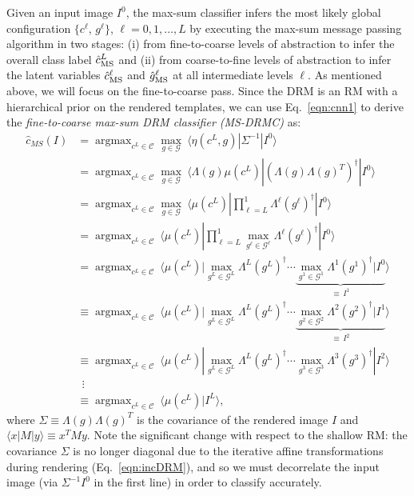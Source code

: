 \documentclass[12pt]{article}
\DeclareMathOperator*{\argmax}{argmax}
\newcommand{\dg}[0]{{ \dagger }}
\newcommand{\Cl}[0]{{ \mathcal{C} }}
\newcommand{\G}[0]{{ \mathcal{G} }}
\begin{document}
Given an input image $I^0$, the max-sum classifier infers the most likely global configuration $\{ c^{\ell}$, $g^\ell \}$, $\ell=0,1,\dots,L$ by executing the max-sum message passing algorithm in two stages: (i) from fine-to-coarse levels of abstraction to infer the overall class label $\hat{c}^L_{\rm MS}$ and (ii) from coarse-to-fine levels of abstraction to infer the latent variables $\hat{c}^\ell_{\rm MS}$ and $\hat{g}^\ell_{\rm MS} $ at all intermediate levels $\ell$. 
As mentioned above, we will focus on the fine-to-coarse pass.
Since the DRM is an RM with a hierarchical prior on the rendered templates, we can use Eq.~\ref{eqn:cnn1} to derive the \emph{fine-to-coarse max-sum DRM classifier (MS-DRMC)} as:
\begin{align} 
	\hat{c}_{MS}(I) &= \argmax_{c^{L} \in \Cl} \max_{g\in \G} \: \langle \eta(c^{L},g) | \Sigma^{-1} | I^{0} \rangle \nonumber\\
	                        &= \argmax_{c^{L} \in \Cl} \max_{g\in \G} \: \langle \Lambda(g) \mu(c^{L}) | (\Lambda(g) \Lambda(g)^{T})^{\dg} | I^{0}  \rangle \nonumber\\
	                        &= \argmax_{c^{L} \in \Cl} \max_{g\in \G} \: \langle \mu(c^{L}) | \prod_{\ell=L}^{1} \Lambda^{\ell}(g^{\ell})^{\dg} | I^{0}  \rangle \nonumber\\
	                        &= \argmax_{c^{L} \in \Cl} \: \langle \mu(c^{L}) | \prod_{\ell=L}^{1} \max_{g^{\ell}\in \G^{\ell}} \Lambda^{\ell}(g^{\ell})^{\dg} | I^{0}  \rangle \nonumber\\
	                        &= \argmax_{c^{L} \in \Cl} \: \langle \mu(c^{L}) | \max_{g^{L}\in \G^{L}} \Lambda^{L}(g^{L})^{\dg} \cdots 
	                            \underbrace{ \max_{g^{1}\in \G^{1}} \Lambda^{1}(g^{1})^{\dg} | I^{0}  }_{\equiv \, I^{1}} \rangle 
	                            \nonumber\\
	                        &\equiv \argmax_{c^{L} \in \Cl} \: \langle \mu(c^{L}) | \max_{g^{L}\in \G^{L}} \Lambda^{L}(g^{L})^{\dg} \cdots 
	                            \underbrace{ \max_{g^{2}\in \G^{2}} \Lambda^{2}(g^{2})^{\dg} | I^{1}  }_{\equiv \, I^{2}}
\rangle 	                            \nonumber\\
	                        &\equiv \argmax_{c^{L} \in \Cl} \: \langle \mu(c^{L}) | \max_{g^{L}\in \G^{L}} \Lambda^{L}(g^{L})^{\dg} \cdots \max_{g^{3}\in \G^{3}} \Lambda^{3}(g^{3})^{\dg} | I^{2}  \rangle \nonumber\\
	                        &~~\vdots \nonumber\\
	                        &\equiv \argmax_{c^{L} \in \Cl} \: \langle \mu(c^{L}) | I^{L}  \rangle, 
	                        \label{eqn:f2c}
\end{align}
where  $\Sigma \equiv \Lambda(g) \Lambda(g)^{T}$ is the covariance of the rendered image $I$ and $\langle x | M | y \rangle \equiv x^{T}M y$. Note the significant change with respect to the shallow RM: the covariance $\Sigma$ is no longer diagonal due to the iterative affine transformations during rendering (Eq.~\ref{eqn:incDRM}), and so we must decorrelate the input  image (via $\Sigma^{-1} I^{0}$  in the first line) in order to classify accurately. 
\end{document}
